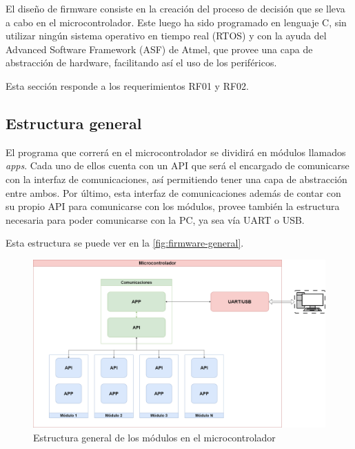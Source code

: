 \documentclass[../et.tex]{subfiles}
\begin{document}
El diseño de firmware consiste en la creación del proceso de decisión que se lleva a cabo en el microcontrolador. Este luego ha sido programado en lenguaje C, sin utilizar ningún sistema operativo en tiempo real (RTOS) y con la ayuda del Advanced Software Framework (ASF) de Atmel, que provee una capa de abstracción de hardware, facilitando así el uso de los periféricos.

Esta sección responde a los requerimientos RF01 y RF02.

\subsection{Estructura general}
El programa que correrá en el microcontrolador se dividirá en módulos llamados \textit{apps}. Cada uno de ellos cuenta con un API que será el encargado de comunicarse con la interfaz de comunicaciones, así permitiendo tener una capa de abstracción entre ambos. Por último, esta interfaz de comunicaciones además de contar con su propio API para comunicarse con los módulos, provee también la estructura necesaria para poder comunicarse con la PC, ya sea vía UART o USB.

Esta estructura se puede ver en la \autoref{fig:firmware-general}.

\begin{figure}[!htbp]
  \centering
  \includegraphics[scale=0.23]{../diagrams/firmware-general.png}
  \caption{Estructura general de los módulos en el microcontrolador}
  \label{fig:firmware-general}
\end{figure}
\end{document}
